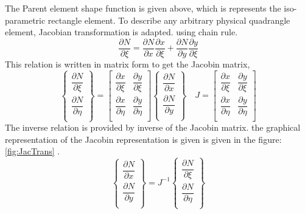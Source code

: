 \documentclass[main.tex]{subfiles}
\begin{document}
The Parent element shape function is given above, which is represents the iso-parametric rectangle element. To describe any arbitrary physical quadrangle element, Jacobian transformation is adapted.
using chain rule.
\begin{equation}
\dfrac{\partial N }{ \partial \xi } = 
\dfrac{\partial N }{ \partial x }
\dfrac{ \partial x }{\partial \xi }  
+
\dfrac{\partial N }{ \partial y }
\dfrac{ \partial y }{\partial \xi } 
\end{equation}
This relation is written in matrix form to get the Jacobin matrix, 
\begin{equation}
\left\{
\begin{array}{r}
\dfrac{\partial N }{ \partial \xi }  \\
\dfrac{\partial N }{ \partial \eta }  \\
\end{array}
\right\}
=
\begin{bmatrix}
\dfrac{ \partial x }{\partial \xi }   &
\dfrac{ \partial y }{\partial \xi } \\
\dfrac{ \partial x }{\partial \eta }   &
\dfrac{ \partial y }{\partial \eta } \\
\end{bmatrix}
\left\{
\begin{array}{r}
\dfrac{\partial N }{ \partial x }  \\
\dfrac{\partial N }{ \partial y }  \\
\end{array}
\right\}
\quad
J=\begin{bmatrix}
\dfrac{ \partial x }{\partial \xi }   &
\dfrac{ \partial y }{\partial \xi } \\
\dfrac{ \partial x }{\partial \eta }   &
\dfrac{ \partial y }{\partial \eta } \\
\end{bmatrix}
\end{equation}
The inverse relation is provided by inverse of the  Jacobin matrix. the graphical representation of the Jacobin representation is given is given in the figure:\ref{fig:JacTrans} .
\begin{equation}
\left\{
\begin{array}{r}
\dfrac{\partial N }{ \partial x }  \\
\dfrac{\partial N }{ \partial y }  \\
\end{array}
\right\}
=
J^{-1}
\left\{
\begin{array}{r}
\dfrac{\partial N }{ \partial \xi }  \\
\dfrac{\partial N }{ \partial \eta }  \\
\end{array}
\right\}
\end{equation}
\end{document}
